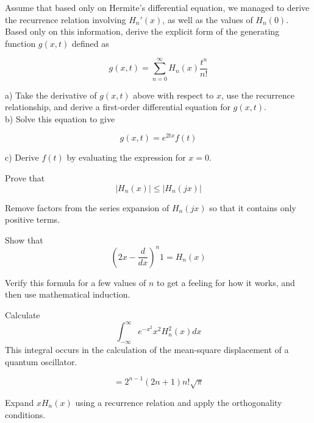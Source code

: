 \begin{exer}
Assume that based only on Hermite's differential equation, we managed to derive the recurrence relation involving $H_n'(x)$, as well as the values of $H_n(0)$. Based only on this information, derive the explicit form of the generating function $g(x,t)$ defined as

$$g(x,t) = \sum_{n = 0}^{\infty} H_n(x)\frac{t^n}{n!} $$

a) Take the derivative of $g(x,t)$ above with respect to $x$, use the recurrence relationship, and derive a first-order differential equation for $g(x,t)$.\\

b) Solve this equation to give

$$g(x,t) = e^{2tx} f(t)$$

c) Derive $f(t)$ by evaluating the expression for $x=0$.
\end{exer}

\begin{exer}
Prove that 
$$ | H_n(x) | \le  | H_n(jx) | $$
\begin{hnt}
  Remove factors from the series expansion of $ H_n(jx) $ so that it contains only positive terms.
\end{hnt}
\end{exer}


\begin{exer}
Show that 
$$\left( 2x - \frac{d}{dx} \right)^n 1 = H_n(x)$$
\begin{hnt}
  Verify this formula for a few values of $n$ to get a feeling for how it works, and then use mathematical induction.
\end{hnt}
\end{exer}


\begin{exer}
Calculate
$$ \int_{-\infty}^{\infty} e^{-x^2} x^2 H_n^2(x) dx $$
This integral occurs in the calculation of the mean-square displacement of a quantum oscillator.
\begin{sol}
$$ = 2^{n-1} (2n + 1) n! \sqrt{\pi}$$
\end{sol}
\begin{hnt}
Expand $x H_n(x)$ using a recurrence relation and apply the orthogonality conditions.
\end{hnt}  
\end{exer}


